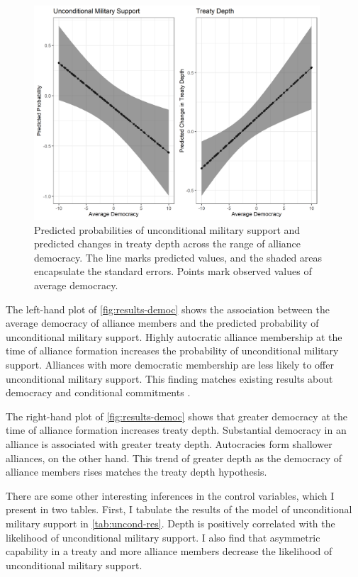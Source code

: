 \documentclass[12pt]{article}
\begin{document}
\begin{figure}[hbtp]
\centering
\includegraphics[width=0.95\textwidth]{../figures/results-democ.png}
\caption{Predicted probabilities of unconditional military support and predicted changes in treaty depth across the range of alliance democracy. The line marks predicted values, and the shaded areas encapsulate the standard errors. Points mark observed values of average democracy.}
\label{fig:results-democ}
\end{figure}


The left-hand plot of \autoref{fig:results-democ} shows the association between the average democracy of alliance members and the predicted probability of unconditional military support. 
Highly autocratic alliance membership at the time of alliance formation increases the probability of unconditional military support. 
Alliances with more democratic membership are less likely to offer unconditional military support. 
This finding matches existing results about democracy and conditional commitments \citep{Mattes2012, Chibaetal2015}.


The right-hand plot of \autoref{fig:results-democ} shows that greater democracy at the time of alliance formation increases treaty depth. 
Substantial democracy in an alliance is associated with greater treaty depth. 
Autocracies form shallower alliances, on the other hand. 
This trend of greater depth as the democracy of alliance members rises matches the treaty depth hypothesis. 


There are some other interesting inferences in the control variables, which I present in two tables. 
First, I tabulate the results of the model of unconditional military support in \autoref{tab:uncond-res}.
Depth is positively correlated with the likelihood of unconditional military support.
I also find that asymmetric capability in a treaty and more alliance members decrease the likelihood of unconditional military support. 
\end{document}
